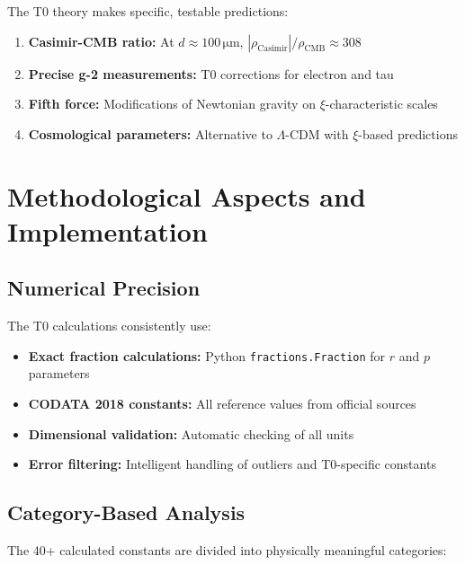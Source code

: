 	The T0 theory makes specific, testable predictions:
	
	\begin{enumerate}
		\item \textbf{Casimir-CMB ratio:} At $d \approx 100\,\si{\micro\meter}$, $|\rho_{\text{Casimir}}|/\rho_{\text{CMB}} \approx 308$
		\item \textbf{Precise g-2 measurements:} T0 corrections for electron and tau
		\item \textbf{Fifth force:} Modifications of Newtonian gravity on $\xi$-characteristic scales
		\item \textbf{Cosmological parameters:} Alternative to $\Lambda$-CDM with $\xi$-based predictions
	\end{enumerate}
	
	\section{Methodological Aspects and Implementation}
	
	\subsection{Numerical Precision}
	
	The T0 calculations consistently use:
	
	\begin{itemize}
		\item \textbf{Exact fraction calculations:} Python \texttt{fractions.Fraction} for $r$ and $p$ parameters
		\item \textbf{CODATA 2018 constants:} All reference values from official sources
		\item \textbf{Dimensional validation:} Automatic checking of all units
		\item \textbf{Error filtering:} Intelligent handling of outliers and T0-specific constants
	\end{itemize}
	
	\subsection{Category-Based Analysis}
	
	The 40+ calculated constants are divided into physically meaningful categories:
	
